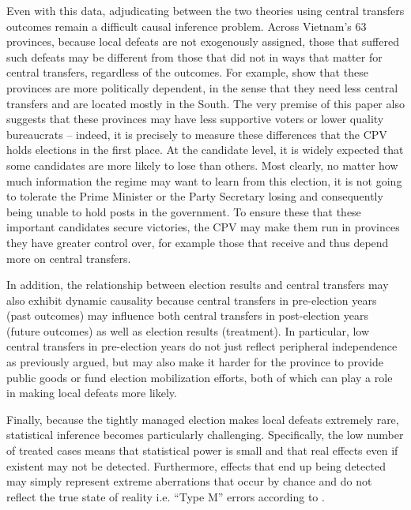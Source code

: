 \documentclass[12pt]{article}
\newcommand{\1}{\mathbbm{1}}
\begin{document}
Even with this data, adjudicating between the two theories using central transfers outcomes remain a difficult causal inference problem. Across Vietnam's 63 provinces, because local defeats are not exogenously assigned, those that suffered such defeats may be different from those that did not in ways that matter for central transfers, regardless of the outcomes. For example, \cite{MaleskySchuler2011} show that these provinces are more politically dependent, in the sense that they need less central transfers and are located mostly in the South. The very premise of this paper also suggests that these provinces may have less supportive voters or lower quality bureaucrats -- indeed, it is precisely to measure these differences that the CPV holds elections in the first place. At the candidate level, it is widely expected that some candidates are more likely to lose than others. Most clearly, no matter how much information the regime may want to learn from this election, it is not going to tolerate the Prime Minister or the Party Secretary losing and consequently being unable to hold posts in the government. To ensure these that these important candidates secure victories, the CPV may make them run in provinces they have greater control over, for example those that receive and thus depend more on central transfers.

In addition, the relationship between election results and central transfers may also exhibit dynamic causality \citep{ImaiKim2012} because central transfers in pre-election years (past outcomes) may influence both central transfers in post-election years (future outcomes) as well as election results (treatment). In particular, low central transfers in pre-election years do not just reflect peripheral independence as previously argued, but may also make it harder for the province to provide public goods or fund election mobilization efforts, both of which can play a role in making local defeats more likely.

Finally, because the tightly managed election makes local defeats extremely rare, statistical inference becomes particularly challenging. Specifically, the low number of treated cases means that statistical power is small and that real effects even if existent may not be detected. Furthermore, effects that end up being detected may simply represent extreme aberrations that occur by chance and do not reflect the true state of reality i.e. ``Type M'' errors according to \citet{Gelman2014}.
\end{document}
